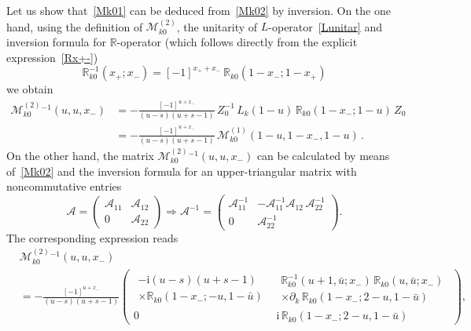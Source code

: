 \documentclass[a4paper,11pt]{article}
\renewcommand{\imath}{\mathrm{i}}
\numberwithin{equation}{section}
\begin{document}
Let us show that~\eqref{Mk01} can be deduced from~\eqref{Mk02} by inversion.
On the one hand, using the definition of $\mathcal{M}^{(2)}_{k0}$, the unitarity of $L$-operator~\eqref{Lunitar} and inversion formula for $\mathbb{R}$-operator (which follows directly from the explicit expression~\eqref{Rx+-})
\begin{equation} \nonumber
	\mathbb{R}_{k0}^{-1}(x_+;x_-) = [-1]^{x_++x_-}\,\mathbb{R}_{k0}(1-x_-;1-x_+)
\end{equation}
we obtain
\begin{align}
	\nonumber
	\mathcal{M}^{(2)}_{k0}{}^{-1}(u,u,x_-) & =
	-\frac{[-1]^{u+x_-}}{(u-s)(u+s-1)}\,Z_0^{-1}\,L_k(1-u)\,\mathbb{R}_{k0}(1-x_-;1-u)\,Z_0 \\
	\label{Minv1}
	& = -\frac{[-1]^{u+x_-}}{(u-s)(u+s-1)}\,\mathcal{M}^{(1)}_{k0}(1-u,1-x_-,1-u) \,.
\end{align}
On the other hand, the matrix $\mathcal{M}^{(2)}_{k0}{}^{-1}(u,u,x_-)$ can be calculated by means of~\eqref{Mk02} and the inversion formula for an upper-triangular matrix with noncommutative entries
\begin{equation} \label{trinv}
	\mathcal{A} =
	\begin{pmatrix}
		\mathcal{A}_{11} & \mathcal{A}_{12} \\
		0 & \mathcal{A}_{22}
	\end{pmatrix}
	\Rightarrow
	\mathcal{A}^{-1} =
	\begin{pmatrix}
		\mathcal{A}_{11}^{-1} & -\mathcal{A}_{11}^{-1}\mathcal{A}_{12}\,\mathcal{A}_{22}^{-1} \\
		0 & \mathcal{A}_{22}^{-1}
	\end{pmatrix} .
\end{equation}
The corresponding expression reads
\begin{align}
	& \nonumber
	\mathcal{M}^{(2)}_{k0}{}^{-1}(u,u,x_-) \\
	& \label{Minv2}
	= -\frac{[-1]^{u+x_-}}{(u-s)(u+s-1)}
	\left(
	\begin{array}{c|c}
		\begin{array}{l}
			-\imath(u-s)(u+s-1) \\ \times\mathbb{R}_{k0}(1-x_-;-u,1-\bar{u})
		\end{array} &
		\begin{array}{l}
			\mathbb{R}_{k0}^{-1}(u+1,\bar{u};x_-)\,\mathbb{R}_{k0}(u,\bar{u};x_-) \\
			\times \partial_k\,\mathbb{R}_{k0}(1-x_-;2-u,1-\bar{u})
		\end{array}
		\\
		\hline
		0 &
		\imath\,\mathbb{R}_{k0}(1-x_-;2-u,1-\bar{u})
	\end{array}
	\right),
\end{align}
\end{document}
